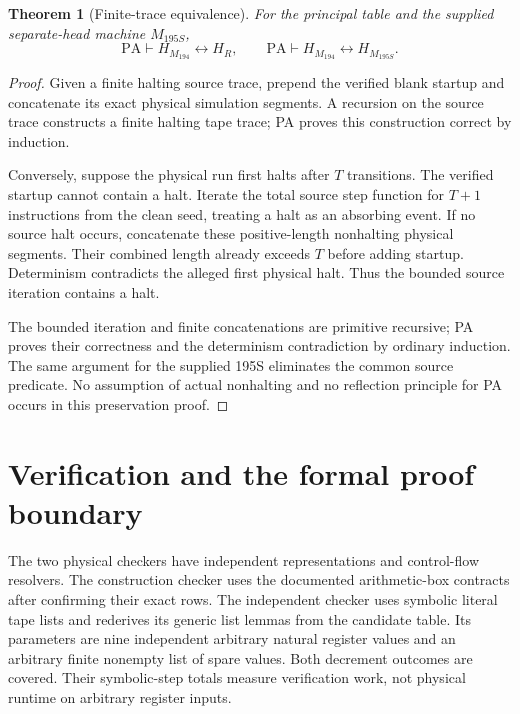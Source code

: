 \documentclass[11pt,letterpaper]{article}
\newcommand{\PA}{\mathrm{PA}}
\newcommand{\MX}{M_{194}}
\newtheorem{theorem}{Theorem}[section]
\begin{document}
\begin{theorem}[Finite-trace equivalence]\label{thm:transport}
For the principal table and the supplied separate-head machine $M_{195S}$,
\[
 \PA\vdash H_{\MX}\leftrightarrow H_R,
 \qquad
 \PA\vdash H_{\MX}\leftrightarrow H_{M_{195S}}.
\]
\end{theorem}
\begin{proof}
Given a finite halting source trace, prepend the verified blank startup
and concatenate its exact physical simulation segments. A recursion on
the source trace constructs a finite halting tape trace; PA proves this
construction correct by induction.

Conversely, suppose the physical run first halts after $T$ transitions.
The verified startup cannot contain a halt. Iterate the total source
step function for $T+1$ instructions from the clean seed, treating a halt
as an absorbing event. If no source halt occurs, concatenate these
positive-length nonhalting physical segments. Their combined length
already exceeds $T$ before adding startup. Determinism contradicts the
alleged first physical halt. Thus the bounded source iteration contains
a halt.

The bounded iteration and finite concatenations are primitive recursive;
PA proves their correctness and the determinism contradiction by ordinary
induction. The same argument for the supplied 195S eliminates the common
source predicate. No assumption of actual nonhalting and no reflection
principle for PA occurs in this preservation proof.
\end{proof}



\section{Verification and the formal proof boundary}
\label{sec:verification}



The two physical checkers have independent representations and control-flow
resolvers. The construction checker uses the documented arithmetic-box
contracts after confirming their exact rows. The independent checker uses
symbolic literal tape lists and rederives its generic list lemmas from
the candidate table. Its parameters are nine independent arbitrary natural
register values and an arbitrary finite nonempty list of spare values.
Both decrement outcomes are covered. Their symbolic-step totals measure
verification work, not physical runtime on arbitrary register inputs.
\end{document}
